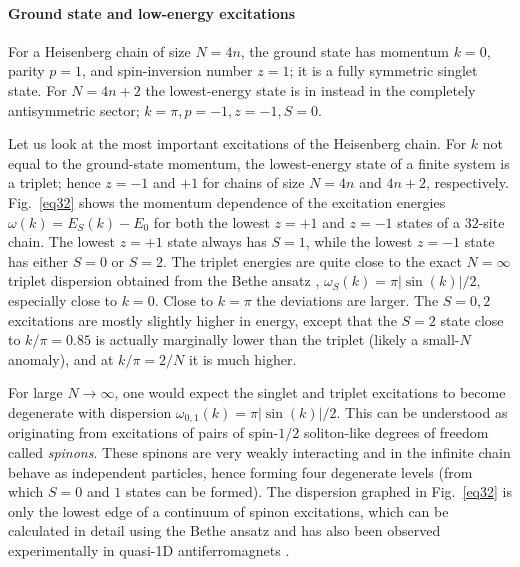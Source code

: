 \documentclass[draft,numberedheadings]{aipproc}
\begin{document}
\paragraph{Ground state and low-energy excitations}

For a Heisenberg chain of size $N=4n$, the ground state has momentum $k=0$, parity $p=1$, and spin-inversion number $z=1$; it is a fully symmetric singlet state. 
For $N=4n+2$ the lowest-energy state is in instead in the completely antisymmetric sector; $k=\pi,p=-1,z=-1,S=0$. 

Let us look at the most important excitations of the Heisenberg chain. For $k$ not equal to the ground-state momentum, the lowest-energy state of a finite 
system is a triplet; hence $z=-1$ and $+1$ for chains of size $N=4n$ and $4n+2$, respectively. Fig.~\ref{eq32} shows the momentum dependence of the excitation 
energies $\omega(k)=E_S(k)-E_0$ for both the lowest $z=+1$ and $z=-1$ states of a $32$-site chain. The lowest $z=+1$ state always has $S=1$, while the lowest 
$z=-1$ state has either $S=0$ or $S=2$. The triplet energies are quite close to the exact $N=\infty$ triplet dispersion obtained from the Bethe ansatz 
\cite{cloizeaux}, $\omega_S(k)=\pi |\sin(k)|/2$, especially close to $k=0$. Close to $k=\pi$ the deviations are larger. The $S=0,2$ excitations are mostly 
slightly higher in energy, except that the $S=2$ state close to $ k/\pi=0.85$ is actually marginally lower than the triplet (likely a small-$N$ anomaly), 
and at $k/\pi=2/N$ it is much higher. 

For large $N \to \infty$, one would expect the singlet and triplet excitations to become degenerate with dispersion $\omega_{0,1}(k)=\pi |\sin(k)|/2$. This  
can be understood as originating from excitations of pairs of spin-$1/2$ soliton-like degrees of freedom called {\it spinons}. These spinons are very 
weakly interacting and in the infinite chain behave as independent particles, hence forming four degenerate levels (from which $S=0$ and $1$ states can be formed). 
The dispersion graphed in Fig.~\ref{eq32} is only the lowest edge of a continuum of spinon excitations, which can be calculated in detail using the Bethe 
ansatz \cite{caux} and has also been observed experimentally in quasi-1D antiferromagnets \cite{lake05}.
\end{document}
